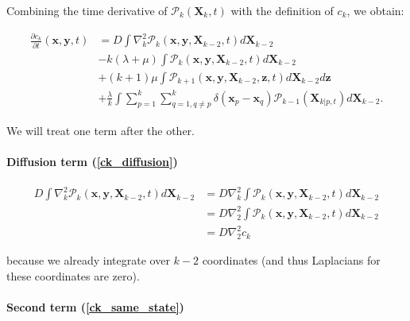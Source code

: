Combining the time derivative of $\mathcal{P}_{k}(\boldsymbol{X}_{k},t)$ with
the definition of $c_{k}$, we obtain:

\begin{subequations} 
\begin{align}
\frac{\partial c_{k}}{\partial t}(\boldsymbol{x},\boldsymbol{y},t) & =D\int\nabla_{k}^{2}\mathcal{P}_{k}(\boldsymbol{x},\boldsymbol{y},\boldsymbol{X}_{k-2},t)d\boldsymbol{X}_{k-2}\label{ck_diffusion}\\
 & -k(\lambda+\mu)\int\mathcal{P}_{k}(\boldsymbol{x},\boldsymbol{y},\boldsymbol{X}_{k-2},t)d\boldsymbol{X}_{k-2}\label{ck_same_state}\\
 & +(k+1)\mu\int\mathcal{P}_{k+1}(\boldsymbol{x},\boldsymbol{y},\boldsymbol{X}_{k-2},\boldsymbol{z},t)d\boldsymbol{X}_{k-2}d\boldsymbol{z}\label{ck_death}\\
 & +\frac{\lambda}{k}\int\sum_{p=1}^{k}\sum_{q=1,q\neq p}^{k}\delta({\boldsymbol{x}_p-\boldsymbol{x}_q})\mathcal{P}_{k-1}(\boldsymbol{X}_{k|p,t})d\boldsymbol{X}_{k-2}.\label{ck_birth}
\end{align}
\end{subequations}

We will treat one term after the other. \\


\paragraph*{Diffusion term (\ref{ck_diffusion})}

\begin{subequations} 
\begin{align}
D\int\nabla_{k}^{2}\mathcal{P}_{k}(\boldsymbol{x},\boldsymbol{y},\boldsymbol{X}_{k-2},t)d\boldsymbol{X}_{k-2} & =D\nabla_{k}^{2}\int\mathcal{P}_{k}(\boldsymbol{x},\boldsymbol{y},\boldsymbol{X}_{k-2},t)d\boldsymbol{X}_{k-2}\\
 & =D\nabla_{2}^{2}\int\mathcal{P}_{k}(\boldsymbol{x},\boldsymbol{y},\boldsymbol{X}_{k-2},t)d\boldsymbol{X}_{k-2}\\
 & =D\nabla_{2}^{2}c_{k}\label{diffusion_term_deriv}
\end{align}
\end{subequations}

because we already integrate over $k-2$ coordinates (and thus Laplacians for these coordinates are zero).

\paragraph*{Second term (\ref{ck_same_state})}


